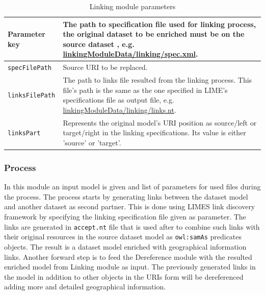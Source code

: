 \documentclass[a4paper,twoside,bibtotoc,abstracton,12pt,BCOR=15mm]{article}
\begin{document}
\begin{table}
\caption{Linking module parameters} \label{tbl:linkingPram}
\small
\begin{tabularx}{\textwidth}{@{}lX@{}}
\toprule
\textbf{Parameter key} 	& The path to specification file used for linking process, the original dataset to be enriched must be on the source dataset , e.g. \url {linkingModuleData/linking/spec.xml}. \\
\toprule
\texttt{specFilePath}	& Source URI to be replaced.\\
\midrule
\texttt{linksFilePath}	& The path to links file resulted from the linking process. This file's path is the same as the one specified in LIME's specifications file as output file, e.g. \url {linkingModuleData/linking/links.nt}.\\
\midrule
\texttt{linksPart} 	& Represents the original model's URI position as source/left or target/right in the linking specifications. Its value is either 'source' or 'target'.\\ 
\bottomrule
\end{tabularx}
\end{table}


\subsubsection{Process}
In this module an input model is given and list of parameters for used files during the process. The process starts by generating links between the dataset model and another dataset as second partner. 
This is done using LIMES link discovery framework by specifying the linking specification file given as parameter.
The links are generated in \texttt{accept.nt} file that is used after to combine such links with their original resources in the source dataset model as \texttt{owl:samAs} predicates objects. The result is a dataset model enriched with geographical information links. 
Another forward step is to feed the Dereference module with the resulted enriched model from Linking module as input. 
The previously generated links in the model in addition to other objects in the URIs form will be dereferenced adding more and detailed geographical information.
\end{document}

